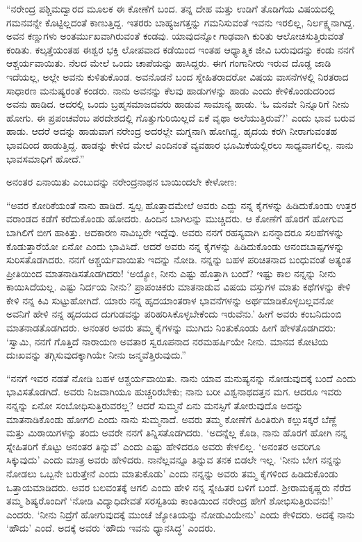 “ನರೇಂದ್ರ ಪಶ್ಚಿಮದ್ವಾರದ ಮೂಲಕ ಈ ಕೋಣೆಗೆ ಬಂದ. ತನ್ನ ದೇಹ ಮತ್ತು ಉಡಿಗೆ ತೊಡಿಗೆಯ ವಿಷಯದಲ್ಲಿ ಗಮನವನ್ನೇ ಕೊಟ್ಟಿಲ್ಲದಂತೆ ಕಾಣುತ್ತಿದ್ದ. ಇತರರು ಬಾಹ್ಯಜಗತ್ತನ್ನು ಗಮನಿಸುವಂತೆ ಇವನು ಇರಲಿಲ್ಲ, ನಿರ್ಲಕ್ಷ್ಯನಾಗಿದ್ದ. ಅವನ ಕಣ್ಣುಗಳು ಅಂತರ್ಮುಖವಾಗಿರುವಂತೆ ಕಂಡವು. ಯಾವುದನ್ನೋ ಗಾಢವಾಗಿ ಕುರಿತು ಆಲೋಚಿಸುತ್ತಿರುವಂತೆ ಕಂಡಿತು. ಕಲ್ಕತ್ತೆಯಂತಹ ಈಶ್ವರ ಭಕ್ತಿ ಲೋಪವಾದ ಕಡೆಯಿಂದ ಇಂತಹ ಆಧ್ಯಾತ್ಮಿಕ ಜೀವಿ ಬರುವುದನ್ನು ಕಂಡು ನನಗೆ ಆಶ್ಚರ್ಯವಾಯಿತು. ನೆಲದ ಮೇಲೆ ಒಂದು ಚಾಪೆಯನ್ನು ಹಾಸಿದ್ದರು. ಈಗ ಗಂಗಾನೀರು ಇರುವ ದೊಡ್ಡ ಜಾಡಿ ಇದೆಯಲ್ಲ, ಅಲ್ಲೇ ಅವನು ಕುಳಿತುಕೊಂಡ. ಅವನೊಡನೆ ಬಂದ ಸ್ನೇಹಿತರಾದರೋ ವಿಷಯ ವಾಸನೆಗಳಲ್ಲಿ ನಿರತರಾದ ಸಾಧಾರಣ ಮನುಷ್ಯರಂತೆ ಕಂಡರು. ನಾನು ಅವನನ್ನು ಕೆಲವು ಹಾಡುಗಳನ್ನು ಹಾಡು ಎಂದು ಕೇಳಿಕೊಂಡುದರಿಂದ ಅವನು ಹಾಡಿದ. ಅದರಲ್ಲಿ ಒಂದು ಬ್ರಹ್ಮಸಮಾಜದವರು ಹಾಡುವ ಸಾಮಾನ್ಯ ಹಾಡು. ‘ಓ ಮನವೇ ನಿನ್ನೂರಿಗೆ ನೀನು ಹೋಗು. ಈ ಪ್ರಪಂಚವೆಂಬ ಪರದೇಶದಲ್ಲಿ ಗೊತ್ತುಗುರಿಯಿಲ್ಲದೆ ಏಕೆ ವೃಥಾ ಅಲೆಯುತ್ತಿರುವೆ?’ ಎಂದು ಭಾವ ಬರುವ ಹಾಡು. ಆದರೆ ಅದನ್ನು ಹಾಡುವಾಗ ನರೇಂದ್ರ ಅದರಲ್ಲೇ ಮಗ್ನನಾಗಿ ಹೋಗಿದ್ದ. ಹೃದಯ ಕರಗಿ ನೀರಾಗುವಂತಹ ಭಾವದಿಂದ ಹಾಡುತ್ತಿದ್ದ. ಹಾಡನ್ನು ಕೇಳಿದ ಮೇಲೆ ಎಂದಿನಂತೆ ವ್ಯವಹಾರ ಭೂಮಿಕೆಯಲ್ಲಿರಲು ಸಾಧ್ಯವಾಗಲಿಲ್ಲ. ನಾನು ಭಾವಸಮಾಧಿಗೆ ಹೋದೆ.”

ಅನಂತರ ಏನಾಯಿತು ಎಂಬುದನ್ನು ನರೇಂದ್ರನಾಥನ ಬಾಯಿಂದಲೇ ಕೇಳೋಣ:

“ಅವರ ಕೋರಿಕೆಯಂತೆ ನಾನು ಹಾಡಿದೆ. ಸ್ವಲ್ಪ ಹೊತ್ತಾದಮೇಲೆ ಅವರು ಎದ್ದು ನನ್ನ ಕೈಗಳನ್ನು ಹಿಡಿದುಕೊಂಡು ಉತ್ತರ ವರಾಂಡದ ಕಡೆಗೆ ಕರೆದುಕೊಂಡು ಹೋದರು. ಹಿಂದಿನ ಬಾಗಿಲನ್ನು ಮುಚ್ಚಿದರು. ಆ ಕೋಣೆಗೆ ಹೊರಗೆ ಹೋಗುವ ಬಾಗಿಲಿಗೆ ಬೀಗ ಹಾಕಿತ್ತು. ಆದಕಾರಣ ನಾವಿಬ್ಬರೇ ಇದ್ದೆವು. ಅವರು ನನಗೆ ರಹಸ್ಯವಾಗಿ ಏನನ್ನಾದರೂ ಸಲಹೆಗಳನ್ನು ಕೊಡುತ್ತಾರೆಯೋ ಏನೋ ಎಂದು ಭಾವಿಸಿದೆ. ಆದರೆ ಅವರು ನನ್ನ ಕೈಗಳನ್ನು ಹಿಡಿದುಕೊಂಡು ಆನಂದಬಾಷ್ಪಗಳನ್ನು ಸುರಿಸತೊಡಗಿದರು. ನನಗೆ ಆಶ್ಚರ್ಯವಾಯಿತು ಇದನ್ನು ನೋಡಿ. ನನ್ನನ್ನು ಬಹಳ ಪರಿಚಿತನಾದ ಬಂಧುವಂತೆ ಅತ್ಯಂತ ಪ್ರೀತಿಯಿಂದ ಮಾತನಾಡಿಸತೊಡಗಿದರು! ‘ಅಯ್ಯೋ, ನೀನು ಎಷ್ಟು ಹೊತ್ತಾಗಿ ಬಂದೆ? ಇಷ್ಟು ಕಾಲ ನನ್ನನ್ನು ನೀನು ಕಾಯಿಸಿದೆಯಲ್ಲ. ಎಷ್ಟು ನಿರ್ದಯ ನೀನು? ಪ್ರಾಪಂಚಿಕರು ಮಾತನಾಡುವ ವಿಷಯ ವಸ್ತುಗಳ ಮಾತು ಕಥೆಗಳನ್ನು ಕೇಳಿ ಕೇಳಿ ನನ್ನ ಕಿವಿ ಸುಟ್ಟುಹೋಗಿದೆ. ಯಾರು ನನ್ನ ಹೃದಯಾಂತರಾಳ ಭಾವನೆಗಳನ್ನು ಅರ್ಥಮಾಡಿಕೊಳ್ಳಬಲ್ಲವನೋ ಅವನಿಗೆ ಹೇಳಿ ನನ್ನ ಹೃದಯದ ದುಗುಡವನ್ನು ಪರಿಹರಿಸಿಕೊಳ್ಳಬೇಕೆಂದು ಇರುವೆನು.’ ಹೀಗೆ ಅವರು ಕಂಬನಿದುಂಬಿ ಮಾತನಾಡತೊಡಗಿದರು. ಅನಂತರ ಅವರು ತಮ್ಮ ಕೈಗಳನ್ನು ಮುಗಿದು ನಿಂತುಕೊಂಡು ಹೀಗೆ ಹೇಳತೊಡಗಿದರು: ‘ಸ್ವಾಮಿ, ನನಗೆ ಗೊತ್ತಿದೆ ನಾರಾಯಣ ಅವತಾರ ಸ್ವರೂಪನಾದ ನರಮಹರ್ಷಿಯೇ ನೀನು. ಮಾನವ ಕೋಟಿಯ ದುಃಖವನ್ನು ತಗ್ಗಿಸುವುದಕ್ಕಾಗಿಯೇ ನೀನು ಜನ್ಮವೆತ್ತಿರುವುದು.”

“ನನಗೆ ಇವರ ನಡತೆ ನೋಡಿ ಬಹಳ ಆಶ್ಚರ್ಯವಾಯಿತು. ನಾನು ಯಾವ ಮನುಷ್ಯನನ್ನು ನೋಡುವುದಕ್ಕೆ ಬಂದೆ ಎಂದು ಭಾವಿಸತೊಡಗಿದೆ. ಅವರು ನಿಜವಾಗಿಯೂ ಹುಚ್ಚರಿರಬೇಕು; ನಾನು ಬರೀ ವಿಶ್ವನಾಥದತ್ತನ ಮಗ. ಆದರೂ ಇವರು ನನ್ನನ್ನು ಏನೋ ಸಂಬೋಧಿಸುತ್ತಿರುವರಲ್ಲ? ಆದರೆ ಸುಮ್ಮನೆ ಏನು ಮನಸ್ಸಿಗೆ ತೋರುವುದೊ ಅದನ್ನು ಮಾತನಾಡಿಕೊಂಡು ಹೋಗಲಿ ಎಂದು ನಾನು ಸುಮ್ಮನಾದೆ. ಅವರು ತಮ್ಮ ಕೋಣೆಗೆ ಹಿಂತಿರುಗಿ ಕಲ್ಲುಸಕ್ಕರೆ ಬೆಣ್ಣೆ ಮತ್ತು ಮಿಠಾಯಿಗಳನ್ನು ತಂದು ಅವರೇ ನನಗೆ ತಿನ್ನಿಸತೊಡಗಿದರು. ‘ಅದನ್ನೆಲ್ಲ ಕೊಡಿ, ನಾನು ಹೊರಗೆ ಹೋಗಿ ನನ್ನ ಸ್ನೇಹಿತರಿಗೆ ಕೊಟ್ಟು ಅನಂತರ ತಿನ್ನುವೆ’ ಎಂದು ಎಷ್ಟು ಹೇಳಿದರೂ ಅವರು ಕೇಳಲಿಲ್ಲ. ‘ಅನಂತರ ಅವರಿಗೂ ಸಿಕ್ಕುವುದು’ ಎಂದು ಮಾತ್ರ ಅವರು ಹೇಳಿದರು. ನಾನೆಲ್ಲವನ್ನೂ ತಿನ್ನುವ ತನಕ ಬಿಡಲೇ ಇಲ್ಲ. ‘ನೀನು ಬೇಗ ನನ್ನನ್ನು ನೋಡಲು ಒಬ್ಬನೇ ಬರುತ್ತೇನೆ ಎಂದು ಮಾತುಕೊಡು’ ಎಂದು ನನ್ನನ್ನು ಅವರು ತಮ್ಮ ಕೈಗಳಿಂದ ಹಿಡಿದುಕೊಂಡು ಒತ್ತಾಯಮಾಡಿದರು. ಅವರ ಬಲವಂತಕ್ಕೆ ಆಗಲಿ ಎಂದು ಹೇಳಿ ನನ್ನ ಸ್ನೇಹಿತರ ಬಳಿಗೆ ಬಂದೆ. ಶ‍್ರೀರಾಮಕೃಷ್ಣರು ನೆರೆದ ತಮ್ಮ ಶಿಷ್ಯರೊಂದಿಗೆ ‘ನೋಡಿ ವಿದ್ಯಾಧಿದೇವತೆ ಸರಸ್ವತಿಯ ಕಾಂತಿಯಿಂದ ನರೇಂದ್ರ ಹೇಗೆ ಶೋಭಿಸುತ್ತಿರುವನು!’ ಎಂದರು. ‘ನೀನು ನಿದ್ರೆಗೆ ಹೋಗುವುದಕ್ಕೆ ಮುಂಚೆ ಜ್ಯೋತಿಯನ್ನು ನೋಡುವಿಯೇನು’ ಎಂದು ಕೇಳಿದರು. ಅದಕ್ಕೆ ನಾನು ‘ಹೌದು’ ಎಂದೆ. ಅದಕ್ಕೆ ಅವರು ‘ಹೌದು ಇವನು ಧ್ಯಾನಸಿದ್ಧ’ ಎಂದರು.

